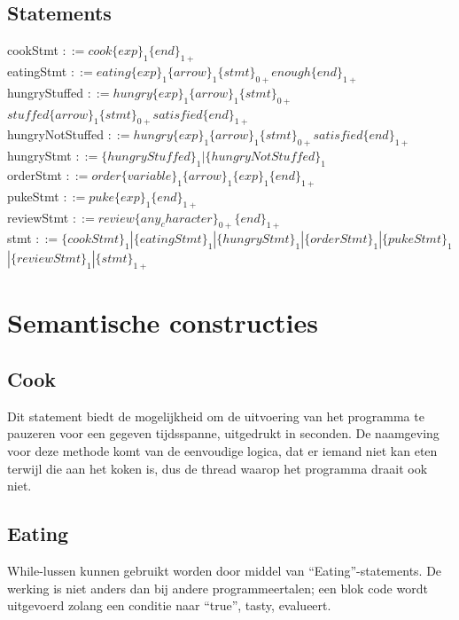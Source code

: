 \documentclass[12pt,a4paper]{report}
\begin{document}
\section{Statements}
cookStmt $::= cook \{exp\}_{1} \{end\}_{1+}$\\
eatingStmt $::= eating \{exp\}_{1} \{arrow\}_{1} \{stmt\}_{0+} enough \{end\}_{1+}$\\
hungryStuffed $::= hungry \{exp\}_{1} \{arrow\}_{1} \{stmt\}_{0+}$\\
\indent\indent\indent\indent $stuffed \{arrow\}_{1} \{stmt\}_{0+} satisfied \{end\}_{1+}$\\
hungryNotStuffed $::= hungry \{exp\}_{1} \{arrow\}_{1} \{stmt\}_{0+} satisfied \{end\}_{1+}$\\
hungryStmt $::= \{hungryStuffed\}_{1} | \{hungryNotStuffed\}_{1}$\\
orderStmt $::= order \{variable\}_{1} \{arrow\}_{1} \{exp\}_{1} \{end\}_{1+}$\\
pukeStmt $::= puke \{exp\}_{1} \{end\}_{1+}$\\
reviewStmt $::= review \{any_character\}_{0+} \{end\}_{1+}$\\
stmt $::= \{cookStmt\}_{1} | \{eatingStmt\}_{1} | \{hungryStmt\}_{1} | \{orderStmt\}_{1} | \{pukeStmt\}_{1}$\\
\indent\indent$| \{reviewStmt\}_{1} | \{stmt\}_{1+}$\\

\chapter{Semantische constructies}
\section{Cook}
Dit statement biedt de mogelijkheid om de uitvoering van het programma te pauzeren voor een gegeven tijdsspanne, uitgedrukt in seconden. De naamgeving voor deze methode komt van de eenvoudige logica, dat er iemand niet kan eten terwijl die aan het koken is, dus de thread waarop het programma draait ook niet.

\section{Eating}
While-lussen kunnen gebruikt worden door middel van ``Eating''-statements. De werking is niet anders dan bij andere programmeertalen; een blok code wordt uitgevoerd zolang een conditie naar ``true'', tasty, evalueert.
\end{document}
